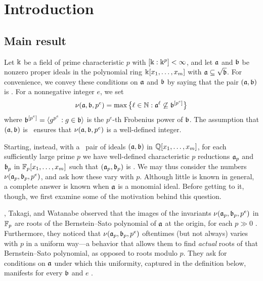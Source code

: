 \documentclass{article}
\begin{document}
\tableofcontents

\newpage

\section{Introduction}

\subsection{Main result}

Let $\Bbbk$ be a field of prime characteristic $p$ with $[\Bbbk:\Bbbk^p] < \infty$, and let $\mathfrak{a}$ and $\mathfrak{b}$ be nonzero proper ideals in the polynomial ring $\Bbbk[x_1,\ldots,x_m]$ with $\mathfrak{a} \subseteq \sqrt {\mathfrak{b}}$.
For convenience, we convey these conditions on $\mathfrak{a}$ and $\mathfrak{b}$ by saying that the pair $(\mathfrak{a},\mathfrak{b})$ is \emph{\compatible}.
For a nonnegative integer $e$, we set
\begin{equation}
   \nu(\mathfrak{a},\mathfrak{b},p^e) = \max\big\{\ell\in \mathbb{N} : \mathfrak{a}^{\ell} \not\subseteq \mathfrak{b}^{[p^e]}\big\}
   \label{eq: nu definition}
\end{equation}
where $\mathfrak{b}^{[p^e]} = \langle g^{p^e} : g \in \mathfrak{b} \rangle$ is the $p^e$-th Frobenius power of $\mathfrak{b}$.
The assumption that $(\mathfrak{a}, \mathfrak{b})$ is \compatible\ ensures that $\nu(\mathfrak{a}, \mathfrak{b}, p^e)$ is a well-defined integer.

Starting, instead, with a \compatible\ pair of ideals $(\mathfrak{a},\mathfrak{b})$ in $\mathbb{Q}[x_1,\ldots,x_m]$, for each sufficiently large prime $p$ we have well-defined characteristic $p$ reductions $\mathfrak{a}_p$ and $\mathfrak{b}_p$ in $\mathbb{F}_p[x_1,\ldots,x_m]$ such that $(\mathfrak{a}_p,\mathfrak{b}_p)$ is \compatible.
We may thus consider the numbers $\nu(\mathfrak{a}_p,\mathfrak{b}_p,p^e)$, and ask how these vary with $p$.
Although little is known in general, a complete answer is known when $\mathfrak{a}$ is a monomial ideal.
Before getting to it, though, we first examine some of the motivation behind this question.

\mustata, Takagi, and Watanabe observed that the images of the invariants $\nu(\mathfrak{a}_p,\mathfrak{b}_p,p^e)$ in $\mathbb{F}_p$ are roots of the Bernstein--Sato polynomial of $\mathfrak{a}$ at the origin, for each $p \gg 0$ \cite[Proposition~3.11]{mustata+takagi+watanabe.F-thresholds}.
Furthermore, they noticed that $\nu(\mathfrak{a}_p,\mathfrak{b}_p,p^e)$ oftentimes (but not always) varies with $p$ in a uniform way---a behavior that allows them to find \emph{actual} roots of that Bernstein--Sato polynomial, as opposed to roots modulo $p$.
They ask for conditions on $\mathfrak{a}$ under which this uniformity, captured in the definition below, manifests for every $\mathfrak{b}$ and $e$ \cite[Problem~3.8]{mustata+takagi+watanabe.F-thresholds}.
\end{document}
